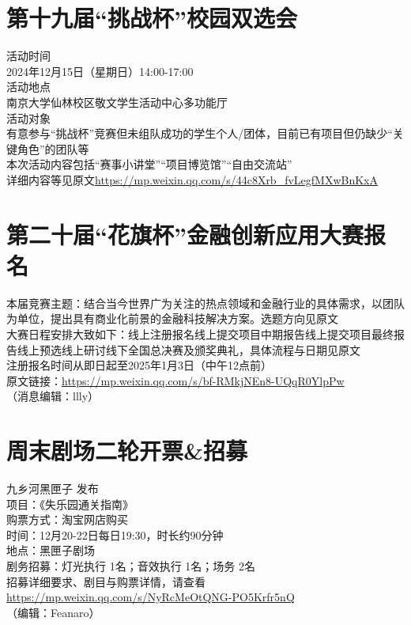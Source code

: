 \documentclass[letterpaper, 12pt]{article}
\begin{document}
\begin{multicols}{2}
\section{第十九届“挑战杯”校园双选会}
活动时间\\
2024年12月15日（星期日）14:00-17:00\\
活动地点\\
南京大学仙林校区敬文学生活动中心多功能厅\\
活动对象\\
有意参与“挑战杯”竞赛但未组队成功的学生个人/团体，目前已有项目但仍缺少“关键角色”的团队等\\
本次活动内容包括“赛事小讲堂”“项目博览馆”“自由交流站”\\
详细内容等见原文\url{https://mp.weixin.qq.com/s/44c8Xrb_fvLegfMXwBnKxA}
\section{第二十届“花旗杯”金融创新应用大赛报名}
本届竞赛主题：结合当今世界广为关注的热点领域和金融行业的具体需求，以团队为单位，提出具有商业化前景的金融科技解决方案。选题方向见原文\\
大赛日程安排大致如下：线上注册报名\rightarrow 线上提交项目中期报告\rightarrow 线上提交项目最终报告\rightarrow 线上预选\rightarrow 线上研讨\rightarrow 线下全国总决赛及颁奖典礼，具体流程与日期见原文\\
注册报名时间从即日起至2025年1月3日（中午12点前）\\
原文链接：\url{https://mp.weixin.qq.com/s/bf-RMkjNEn8-UQqR0YlpPw}\\
（消息编辑：llly）

\section{周末剧场二轮开票\&招募}
九乡河黑匣子 发布\\
项目：《失乐园通关指南》\\
购票方式：淘宝网店购买\\
时间：12月20-22日每日19:30，时长约90分钟\\
地点：黑匣子剧场\\
剧务招募：灯光执行 1名；音效执行 1名；场务 2名\\
招募详细要求、剧目与购票详情，请查看\url{https://mp.weixin.qq.com/s/NyRcMeOtQNG-PO5Krfr5nQ}\\
（编辑：Feanaro）
\end{multicols} 
\end{document}
